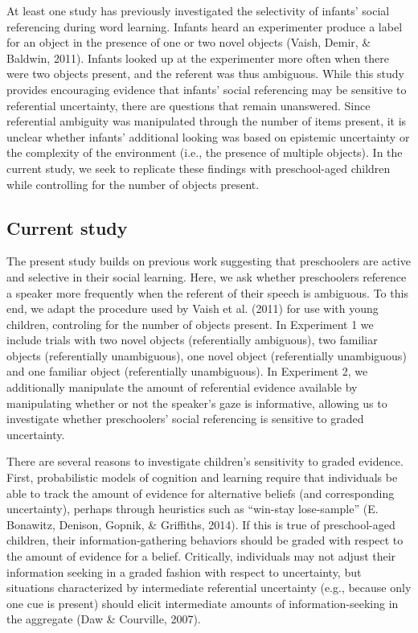 \documentclass[a4paper,man,apacite,floatsintext]{apa6}
\begin{document}
At least one study has previously investigated the selectivity of
infants' social referencing during word learning. Infants heard an
experimenter produce a label for an object in the presence of one or two
novel objects (Vaish, Demir, \& Baldwin, 2011). Infants looked up at the
experimenter more often when there were two objects present, and the
referent was thus ambiguous. While this study provides encouraging
evidence that infants' social referencing may be sensitive to
referential uncertainty, there are questions that remain unanswered.
Since referential ambiguity was manipulated through the number of items
present, it is unclear whether infants' additional looking was based on
epistemic uncertainty or the complexity of the environment (i.e., the
presence of multiple objects). In the current study, we seek to
replicate these findings with preschool-aged children while controlling
for the number of objects present.

\subsection{Current study}\label{current-study}

The present study builds on previous work suggesting that preschoolers
are active and selective in their social learning. Here, we ask whether
preschoolers reference a speaker more frequently when the referent of
their speech is ambiguous. To this end, we adapt the procedure used by
Vaish et al. (2011) for use with young children, controling for the
number of objects present. In Experiment 1 we include trials with two
novel objects (referentially ambiguous), two familiar objects
(referentially unambiguous), one novel object (referentially
unambiguous) and one familiar object (referentially unambiguous). In
Experiment 2, we additionally manipulate the amount of referential
evidence available by manipulating whether or not the speaker's gaze is
informative, allowing us to investigate whether preschoolers' social
referencing is sensitive to graded uncertainty.

There are several reasons to investigate children's sensitivity to
graded evidence. First, probabilistic models of cognition and learning
require that individuals be able to track the amount of evidence for
alternative beliefs (and corresponding uncertainty), perhaps through
heuristics such as ``win-stay lose-sample'' (E. Bonawitz, Denison,
Gopnik, \& Griffiths, 2014). If this is true of preschool-aged children,
their information-gathering behaviors should be graded with respect to
the amount of evidence for a belief. Critically, individuals may not
adjust their information seeking in a graded fashion with respect to
uncertainty, but situations characterized by intermediate referential
uncertainty (e.g., because only one cue is present) should elicit
intermediate amounts of information-seeking in the aggregate (Daw \&
Courville, 2007).
\end{document}
